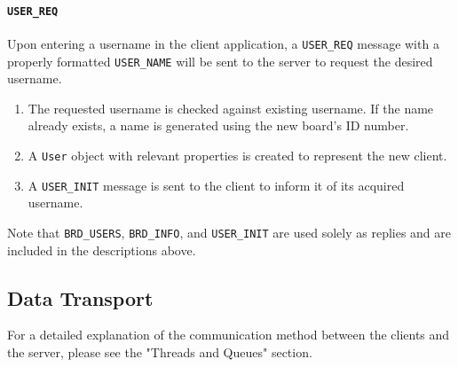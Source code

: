 \paragraph{\texttt{USER\_REQ}} Upon entering a username in the client application, a \texttt{USER\_REQ} message with a properly formatted \texttt{USER\_NAME} will be sent to the server to request the desired username.
\begin{enumerate}
\item The requested username is checked against existing username. If the name already exists, a name is generated using the new board's ID number.
\item A \texttt{User} object with relevant properties is created to represent the new client.
\item A \texttt{USER\_INIT} message is sent to the client to inform it of its acquired username.
\end{enumerate}

Note that \texttt{BRD\_USERS}, \texttt{BRD\_INFO}, and \texttt{USER\_INIT} are used solely as replies and are included in the descriptions above.


\subsection{Data Transport}
For a detailed explanation of the communication method between the clients and the server, please see the "Threads and Queues" section.